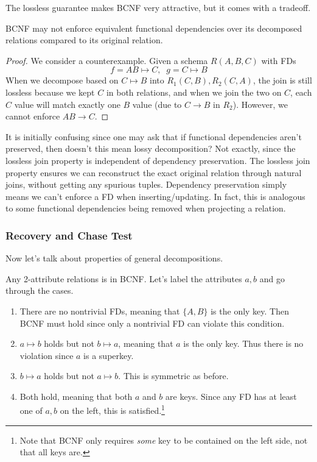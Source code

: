   The lossless guarantee makes BCNF very attractive, but it comes with a tradeoff. 

  \begin{theorem}
    BCNF may not enforce equivalent functional dependencies over its decomposed relations compared to its original relation. 
  \end{theorem}
  \begin{proof}
    We consider a counterexample. Given a schema $R(A, B, C)$ with FDs 
    \begin{equation}
      f = AB \mapsto C, \;\; g = C \mapsto B
    \end{equation} 
    When we decompose based on $C \mapsto B$ into $R_1 (C, B), R_2(C, A)$, the join is still lossless because we kept $C$ in both relations, and when we join the two on $C$, each $C$ value will match exactly one $B$ value (due to $C \rightarrow B$ in $R_2$). However, we cannot enforce $AB \rightarrow C$. 
  \end{proof}

  It is initially confusing since one may ask that if functional dependencies aren't preserved, then doesn't this mean lossy decomposition? Not exactly, since the lossless join property is independent of dependency preservation. The lossless join property ensures we can reconstruct the exact original relation through natural joins, without getting any spurious tuples. Dependency preservation simply means we can't enforce a FD when inserting/updating. In fact, this is analogous to some functional dependencies being removed when projecting a relation. 

\subsubsection{Recovery and Chase Test} 

  Now let's talk about properties of general decompositions. 

  \begin{theorem}
    Any 2-attribute relations is in BCNF. Let's label the attributes $a, b$ and go through the cases. 
    \begin{enumerate}
      \item There are no nontrivial FDs, meaning that $\{A, B\}$ is the only key. Then BCNF must hold since only a nontrivial FD can violate this condition. 
      \item $a \mapsto b$ holds but not $b \mapsto a$, meaning that $a$ is the only key. Thus there is no violation since $a$ is a superkey. 
      \item $b \mapsto a$ holds but not $a \mapsto b$. This is symmetric as before. 
      \item Both hold, meaning that both $a$ and $b$ are keys. Since any FD has at least one of $a, b$ on the left, this is satisfied.\footnote{Note that BCNF only requires \textit{some} key to be contained on the left side, not that all keys are. } 
    \end{enumerate}
  \end{theorem}

